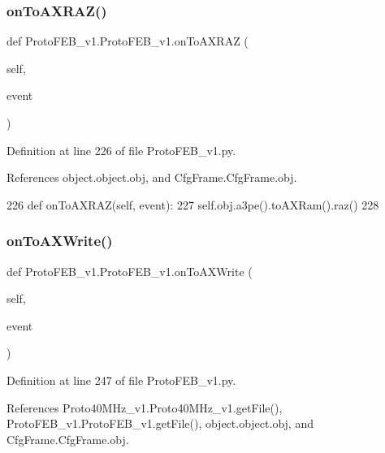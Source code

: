 \subsubsection{\texorpdfstring{on\+To\+A\+X\+R\+A\+Z()}{onToAXRAZ()}}
{\footnotesize\ttfamily def Proto\+F\+E\+B\+\_\+v1.\+Proto\+F\+E\+B\+\_\+v1.\+on\+To\+A\+X\+R\+AZ (\begin{DoxyParamCaption}\item[{}]{self,  }\item[{}]{event }\end{DoxyParamCaption})}



Definition at line 226 of file Proto\+F\+E\+B\+\_\+v1.\+py.



References object.\+object.\+obj, and Cfg\+Frame.\+Cfg\+Frame.\+obj.


\begin{DoxyCode}
226     \textcolor{keyword}{def }onToAXRAZ(self, event):
227         self.obj.a3pe().toAXRam().raz()
228 
\end{DoxyCode}
\mbox{\label{classProtoFEB__v1_1_1ProtoFEB__v1_ae6649390f039b699c26021eb1c1e8efb}} 
\subsubsection{\texorpdfstring{on\+To\+A\+X\+Write()}{onToAXWrite()}}
{\footnotesize\ttfamily def Proto\+F\+E\+B\+\_\+v1.\+Proto\+F\+E\+B\+\_\+v1.\+on\+To\+A\+X\+Write (\begin{DoxyParamCaption}\item[{}]{self,  }\item[{}]{event }\end{DoxyParamCaption})}



Definition at line 247 of file Proto\+F\+E\+B\+\_\+v1.\+py.



References Proto40\+M\+Hz\+\_\+v1.\+Proto40\+M\+Hz\+\_\+v1.\+get\+File(), Proto\+F\+E\+B\+\_\+v1.\+Proto\+F\+E\+B\+\_\+v1.\+get\+File(), object.\+object.\+obj, and Cfg\+Frame.\+Cfg\+Frame.\+obj.


